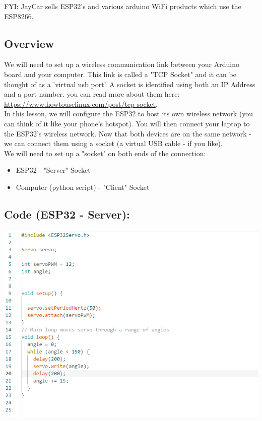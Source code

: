 \documentclass[a4paper,12pt]{report}
\newcommand{\diagramWidth}{150mm}
\begin{document}
    FYI: JayCar sells ESP32's and various arduino WiFi products which use the ESP8266.


    \subsection*{Overview}
    We will need to set up a wireless communication link between your Arduino board and your computer.
    This link is called a "TCP Socket" and it can be thought of as a 'virtual usb port'. A socket is identified using both an IP Address and a port number.
     you can read more about them here: 
    \url{https://www.howtouselinux.com/post/tcp-socket}. \\

    In this lesson, we will configure the ESP32 to host its own wireless network (you can think of it like your phone's hotspot).
    You will then connect your laptop to the ESP32's wireless network. Now that both devices are
    on the same network - we can connect them using a socket (a virtual USB cable - if you like).\\

    
    We will need to set up a "socket" on both ends of the connection:
    \begin{itemize}
        \item ESP32 - "Server" Socket
        \item Computer (python script) - "Client" Socket
    \end{itemize}

    \newpage
    \subsection*{Code (ESP32 - Server):}
        \begin{mdframed}[linewidth = 3, linecolor = turbo_purple]
            \includegraphics[width = \diagramWidth]{Assets/servoCode.png}
        \end{mdframed}
\end{document}

